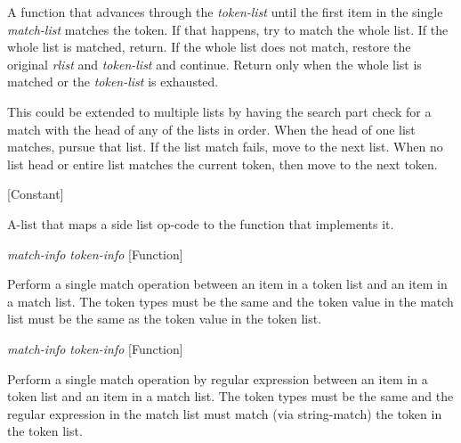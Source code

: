 \begin{doc-string}
A function that advances through the \emph{token-list} until the first item in the
single \emph{match-list} matches the token.  If that happens, try to match the whole
list.  If the whole list is matched, return.  If the whole list does not match,
restore the original \emph{rlist} and \emph{token-list} and continue.  Return only when the
whole list is matched or the \emph{token-list} is exhausted.

This could be extended to multiple lists by having the search part check for a
match with the head of any of the lists in order.  When the head of one list
matches, pursue that list.  If the list match fails, move to the next list.
When no list head or entire list matches the current token, then move to the
next token.
\end{doc-string}

\vspace{1em}
\noindent
{}
\usebox{\funcname}
 \hfill [Constant]

\begin{doc-string}
A-list that maps a side list op-code to the function that implements it.
\end{doc-string}

\vspace{1em}
\noindent
{}
\usebox{\funcname}\emph{match-info} \emph{token-info}
 \hfill [Function]

\begin{doc-string}
Perform a single match operation between an item in a token list and an item
in a match list.  The token types must be the same and the token value in the
match list must be the same as the token value in the token list.
\end{doc-string}

\vspace{1em}
\noindent
{}
\usebox{\funcname}\emph{match-info} \emph{token-info}
 \hfill [Function]

\begin{doc-string}
Perform a single match operation by regular expression between an
item in a token list and an item in a match list.  The token types
must be the same and the regular expression in the match list must
match (via string-match) the token in the token list.
\end{doc-string}

